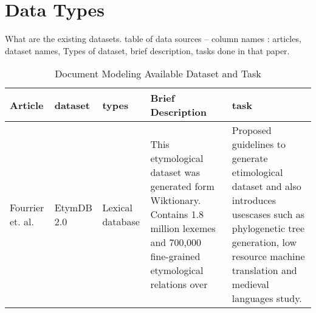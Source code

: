 \section{Data Types}
What are the existing datasets.
table of data sources -- column names : articles, dataset names, Types of dataset, brief description, tasks done in that paper.

\begin{longtable}
    {|p{2cm}|p{2cm}|p{2cm}|p{4cm}|p{4cm}|}
    \caption{Document Modeling Available Dataset and Task}
    \label{tab:datasets_task}                                                                                                                                                                                                                                                                                                                                                                                                                                                                                                                                                                               \\\hline
    Article                                              & dataset                                                                                                           & types                                                                                         & Brief Description                                                                                                                                                                    & task                                                                                                                                  \\ \hline
    Fourrier et. al. \cite{fourrier_methodological_2020} & EtymDB 2.0                                                                                                        & Lexical database                                                                              & This etymological dataset was generated form Wiktionary. Contains 1.8 million lexemes and 700,000 fine-grained etymological relations over                                           & Proposed guidelines to generate etimological dataset and also introduces usescases such as phylogenetic tree generation, low resource
    machine translation and medieval languages study.                                                                                                                                                                                                                                                                                                                                                                                                                                                                                                                                                       \\ \hline

\end{longtable}
